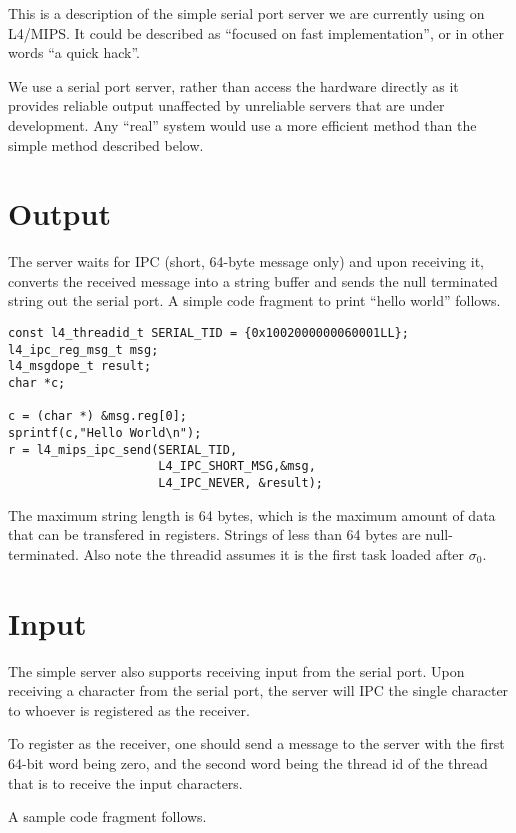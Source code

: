 \documentclass[a4paper,11pt,twoside,dvips]{book}
\newlength{\Up}\setlength{\Up}{-\baselineskip}
\newcommand{\sigz}{\mbox{$\sigma_{0}$}}
\begin{document}
This is a description of the simple serial port server we are currently
using on L4/MIPS. It could be described as ``focused on fast
implementation'', or in other words ``a quick hack''.

We use a serial port server, rather than access the hardware directly as
it provides reliable output unaffected by unreliable servers that are
under development. Any ``real'' system would use a more efficient method
than the simple method described below.

\section{Output}

The server waits for IPC (short, 64-byte message only) 
and upon receiving it, converts the received message
into a string buffer and sends the null terminated string out the serial
port. A simple code fragment to print ``hello world'' follows.

{\small
\begin{verbatim}
const l4_threadid_t SERIAL_TID = {0x1002000000060001LL};
l4_ipc_reg_msg_t msg;
l4_msgdope_t result;
char *c;

c = (char *) &msg.reg[0];
sprintf(c,"Hello World\n");
r = l4_mips_ipc_send(SERIAL_TID, 
                     L4_IPC_SHORT_MSG,&msg,
                     L4_IPC_NEVER, &result);
\end{verbatim}
}

The maximum string length is 64 bytes, which is the maximum
amount of data that can be transfered in registers. Strings of
less than 64 bytes are null-terminated. Also note the threadid
assumes it is the first task loaded after \sigz.



\section{Input}

The simple server also supports receiving input from the serial
port. Upon receiving a character from the serial port, the server will
IPC the single character to whoever is registered as the receiver.

To register as the receiver, one should send a message to the server
with the first 64-bit word being zero, and the second word being the
thread id of the thread that is to receive the input characters.

A sample code fragment follows.
\end{document}
